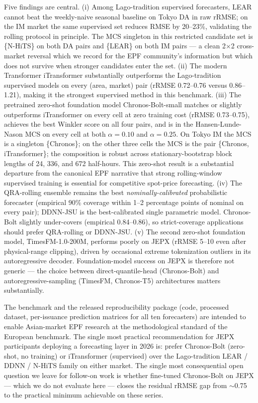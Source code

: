 \documentclass[review,3p,times,authoryear]{elsarticle}
\begin{document}
Five findings are central. (i) Among Lago-tradition supervised forecasters, LEAR cannot beat the weekly-naive seasonal baseline on Tokyo DA in raw rRMSE; on the IM market the same supervised set reduces RMSE by 20--23\%, validating the rolling protocol in principle. The MCS singleton in this restricted candidate set is \{N-HiTS\} on both DA pairs and \{LEAR\} on both IM pairs --- a clean 2\(\times\)2 cross-market reversal which we record for the EPF community's information but which does not survive when stronger candidates enter the set. (ii) The modern Transformer iTransformer substantially outperforms the Lago-tradition supervised models on every (area, market) pair (rRMSE 0.72--0.76 versus 0.86--1.21), making it the strongest supervised method in this benchmark. (iii) The pretrained zero-shot foundation model Chronos-Bolt-small matches or slightly outperforms iTransformer on every cell at zero training cost (rRMSE 0.73--0.75), achieves the best Winkler score on all four pairs, and is in the Hansen-Lunde-Nason MCS on every cell at both \(\alpha=0.10\) and \(\alpha=0.25\). On Tokyo IM the MCS is a singleton \{Chronos\}; on the other three cells the MCS is the pair \{Chronos, iTransformer\}; the composition is robust across stationary-bootstrap block lengths of 24, 336, and 672 half-hours. This zero-shot result is a substantial departure from the canonical EPF narrative that strong rolling-window supervised training is essential for competitive spot-price forecasting. (iv) The QRA-rolling ensemble remains the best \emph{nominally-calibrated} probabilistic forecaster (empirical 90\% coverage within 1--2 percentage points of nominal on every pair); DDNN-JSU is the best-calibrated single parametric model. Chronos-Bolt slightly under-covers (empirical 0.84--0.86), so strict-coverage applications should prefer QRA-rolling or DDNN-JSU. (v) The second zero-shot foundation model, TimesFM-1.0-200M, performs poorly on JEPX (rRMSE 5--10 even after physical-range clipping), driven by occasional extreme tokenization outliers in its autoregressive decoder. Foundation-model success on JEPX is therefore not generic --- the choice between direct-quantile-head (Chronos-Bolt) and autoregressive-sampling (TimesFM, Chronos-T5) architectures matters substantially.

The benchmark and the released reproducibility package (code, processed dataset, per-issuance prediction matrices for all ten forecasters) are intended to enable Asian-market EPF research at the methodological standard of the European benchmark. The single most practical recommendation for JEPX participants deploying a forecasting layer in 2026 is: prefer Chronos-Bolt (zero-shot, no training) or iTransformer (supervised) over the Lago-tradition LEAR / DDNN / N-HiTS family on either market. The single most consequential open question we leave for follow-on work is whether fine-tuned Chronos-Bolt on JEPX --- which we do not evaluate here --- closes the residual rRMSE gap from \(\sim\)0.75 to the practical minimum achievable on these series.
\end{document}
